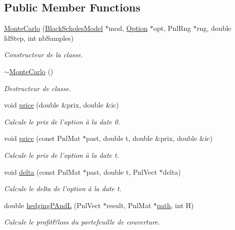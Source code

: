 \subsection*{Public Member Functions}
\begin{DoxyCompactItemize}
\item 
\hyperlink{classMonteCarlo_a01b66bd9e983f9adc235bd80c1c544bd}{Monte\-Carlo} (\hyperlink{classBlackScholesModel}{Black\-Scholes\-Model} $\ast$mod, \hyperlink{classOption}{Option} $\ast$opt, Pnl\-Rng $\ast$rng, double fd\-Step, int nb\-Samples)
\begin{DoxyCompactList}\small\item\em Constructeur de la classe. \end{DoxyCompactList}\item 
\hyperlink{classMonteCarlo_af53fc3a679af18b51a3002b4c1f6b6c2}{$\sim$\-Monte\-Carlo} ()
\begin{DoxyCompactList}\small\item\em Destructeur de classe. \end{DoxyCompactList}\item 
void \hyperlink{classMonteCarlo_a5979d4378e3f28878152a310d8a1f7bf}{price} (double \&prix, double \&ic)
\begin{DoxyCompactList}\small\item\em Calcule le prix de l'option à la date 0. \end{DoxyCompactList}\item 
void \hyperlink{classMonteCarlo_aa7bfce4384323c697d0b06840ad3140f}{price} (const Pnl\-Mat $\ast$past, double t, double \&prix, double \&ic)
\begin{DoxyCompactList}\small\item\em Calcule le prix de l'option à la date t. \end{DoxyCompactList}\item 
void \hyperlink{classMonteCarlo_a340cd456dbe44df20cbc44d40c4df5f5}{delta} (const Pnl\-Mat $\ast$past, double t, Pnl\-Vect $\ast$delta)
\begin{DoxyCompactList}\small\item\em Calcule le delta de l'option à la date t. \end{DoxyCompactList}\item 
double \hyperlink{classMonteCarlo_a24bfcbce4eabfc4382c194139cd7893b}{hedging\-P\-And\-L} (Pnl\-Vect $\ast$result, Pnl\-Mat $\ast$\hyperlink{classMonteCarlo_acf1971465a6503457dfacd397f29ee89}{path}, int H)
\begin{DoxyCompactList}\small\item\em Calcule le profit\&loss du portefeuille de couverture. \end{DoxyCompactList}\end{DoxyCompactItemize}
